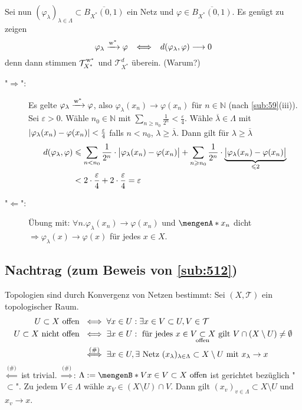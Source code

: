 Sei nun $(\varphi_\lambda)_{\lambda \in \Lambda} \subset \overline{B_{X^*}(0,1)}$ ein Netz und $\varphi \in \overline{B_{X^*}(0,1)}$. Es genügt zu zeigen
\[
	\varphi_\lambda \xrightarrow{\w^*} \varphi \enspace \iff \enspace  d(\varphi_\lambda, \varphi) \longrightarrow 0
\]
denn dann stimmen $\weakTstar{X^*}$ und $\mathcal{T}_{X^*}^d$ überein. (Warum?)
\begin{description}
	\item["$\Rightarrow $":] Es gelte $\varphi_\lambda \xrightarrow{\w^*} \varphi$, also $\varphi_\lambda(x_n) \to \varphi(x_n)$ für $n \in \mathds{N}$ (nach 
	\ref{sub:59}(iii)). Sei $\varepsilon>0$. Wähle $n_0 \in \mathds{N}$ mit $\sum_{n \ge n_0} \frac{1}{2^n} < \frac{\varepsilon}{4}$. Wähle $\overline{\lambda} \in \Lambda$
	mit $\abs*{\varphi_\lambda(x_n)- \varphi(x_n)} < \frac{\varepsilon}{4}$ falls $n < n_0$, $\lambda \ge \overline{\lambda}$. Dann gilt für $\lambda \ge\overline{\lambda}$
	\begin{align*}
		d(\varphi_\lambda,\varphi) &\le \sum_{n < n_0} \frac{1}{2^n} \cdot \abs[\big]{\varphi_\lambda(x_n)- \varphi(x_n)} + \sum_{n \ge n_0} \frac{1}{2^n} \cdot 
		\underbrace{\abs[\big]{\varphi_\lambda(x_n) - \varphi(x_n)}}_{\le 2} \\
		&< 2 \cdot \frac{\varepsilon}{4} + 2 \cdot \frac{\varepsilon}{4}  = \varepsilon
	\end{align*}
	\item["$\Leftarrow$":] Übung mit: $\forall n . \varphi_\lambda(x_n) \to \varphi(x_n)$ und $ \set{x_n}$ dicht $\Rightarrow \varphi_\lambda(x) \to \varphi(x)$ für jedes
	$x \in X$. \bewende
\end{description}

\subsection*{Nachtrag (zum Beweis von \ref{sub:512})} %
\label{sub:nachtrag_512}
Topologien sind durch Konvergenz von Netzen bestimmt: Sei $(X,\mathcal{T})$ ein topologischer Raum. 
\begin{align*}
	U \subset X \text{ offen } &\iff \forall x \in U : \exists x \in V \subset U, V \in \mathcal{T} \\
	U \subset X \text{ nicht offen } &\iff \exists x \in U : \text{ für jedes } x \in V \underset{\mathclap{\text{offen}}}{\subset} X \text{ gilt } V \cap (X \setminus U) 
	\not= \emptyset \\
	&\stackrel{\text{(\#)}}{\iff} \exists x \in U, \exists \text{ Netz } (x_\lambda)_{\lambda \in \Lambda} \subset X \setminus U \text{ mit } x_\lambda \to x
\end{align*}
$\stackrel{\text{(\#)}}{\Longleftarrow}$ ist trivial. $\stackrel{\text{(\#)}}{\Longrightarrow}$: $\Lambda := \set[V]{x \in V \subset X \text{ offen}}$ ist 
gerichtet bezüglich "$\subset$". Zu jedem $V \in \Lambda$ wähle  $x_V \in (X \setminus U) \cap V$. Dann gilt 
$(x_v)_{v \in \Lambda} \subset X \setminus U$ und $x_v \to x$.

